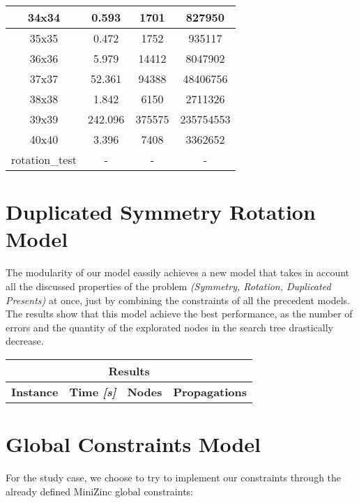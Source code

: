 \begin{center}
\begin{tabular}{|c|c|c|c|}
        34x34 & 0.593 & 1701 & 827950 \\ \hline
        35x35 & 0.472 & 1752 & 935117 \\ \hline
        36x36 & 5.979 & 14412 & 8047902 \\ \hline
        37x37 & 52.361 & 94388 & 48406756 \\ \hline
        38x38 & 1.842 & 6150 & 2711326 \\ \hline
        39x39 & 242.096 & 375575 & 235754553 \\ \hline
        40x40 & 3.396 & 7408 & 3362652 \\ \hline
        rotation\_test & - & - & - \\ \hline
    \end{tabular}
\end{center}

\section{Duplicated Symmetry Rotation Model}
The modularity of our model eassily achieves a new model that takes in account all the discussed properties of the problem
\textit{(Symmetry, Rotation, Duplicated Presents)} at once, just by combining the constraints of all the precedent models.
The results show that this model achieve the best performance, as the number of errors and the quantity of the explorated nodes in the
search tree drastically decrease.  

\begin{center}
    \begin{tabular}{|c|c|c|c|}
        \hline
        \multicolumn{4}{|c|}{\textbf{Results}} \\
        \hline
        \textbf{Instance} & \textbf{Time \textit{[s]}} & \textbf{Nodes} & \textbf{Propagations} \\
        \hline
    \end{tabular}
\end{center}

\section{Global Constraints Model}
For the study case, we choose to try to implement our constraints through the already defined MiniZinc global constraints:

